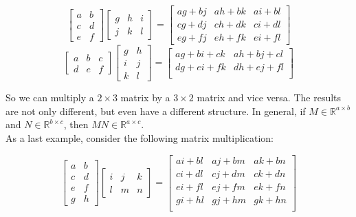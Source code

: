     \begin{equation*}
      \begin{bmatrix} a & b \\ c & d \\ e & f\end{bmatrix}\begin{bmatrix}g & h & i \\ j & k & l\end{bmatrix} =
        \begin{bmatrix} ag+bj & ah+bk & ai+bl \\ cg+dj & ch+dk & ci+dl \\ eg+fj & eh+fk & ei+fl\end{bmatrix}
    \end{equation*}
    \begin{equation*}
      \begin{bmatrix}a & b & c \\ d & e & f\end{bmatrix}\begin{bmatrix} g & h \\ i & j \\ k & l\end{bmatrix} =
        \begin{bmatrix} ag+bi+ck & ah+bj+cl \\ dg+ei+fk & dh+ej+fl \\\end{bmatrix}
    \end{equation*}

So we can multiply a $2 \times 3$ matrix by a $3 \times 2$ matrix and vice versa. The results are not only different, but even have a different structure. In general, if $M \in \mathbb{R}^{a \times b}$ and $N \in \mathbb{R}^{b \times c}$, then $MN \in \mathbb{R}^{a \times c}$.\\

As a last example, consider the following matrix multiplication:

    \begin{equation*}
      \begin{bmatrix} a & b \\ c & d \\ e & f \\ g & h\end{bmatrix}\begin{bmatrix}i & j & k \\ l & m & n\end{bmatrix} =
        \begin{bmatrix} ai+bl & aj+bm & ak+bn \\ ci+dl & cj+dm & ck+dn \\ ei+fl & ej+fm & ek+fn \\ gi+hl & gj+hm & gk+hn \\ \end{bmatrix}
    \end{equation*}

